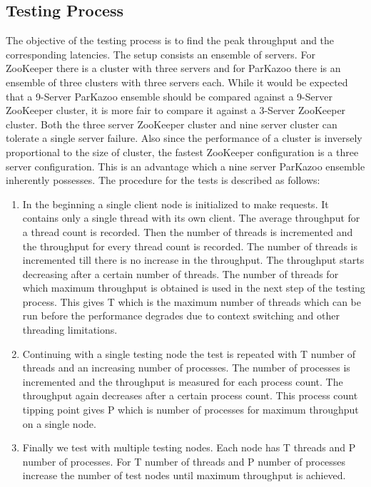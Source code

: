 \subsection{Testing Process}
The objective of the testing process is to find the peak throughput and the corresponding latencies. The setup consists an ensemble of servers. For ZooKeeper there is a cluster with three servers and for ParKazoo there is an ensemble of three clusters with three servers each. While it would be expected that a 9-Server ParKazoo ensemble should be compared against a 9-Server ZooKeeper cluster, it is more fair to compare it against a 3-Server ZooKeeper cluster. Both the three server ZooKeeper cluster and nine server cluster can tolerate a single server failure. Also since the performance of a cluster is inversely proportional to the size of cluster, the fastest ZooKeeper configuration is a three server configuration. This is an advantage which a nine server ParKazoo ensemble inherently possesses. The procedure for the tests is described as follows:

\begin{enumerate}
	\item In the beginning a single client node is initialized to make requests. It contains only a single thread with its own client. The average throughput for a thread count is recorded. Then the number of threads is incremented and the throughput for every thread count is recorded. The number of threads is incremented till there is no increase in the throughput. The throughput starts decreasing after a certain number of threads. The number of threads for which maximum throughput is obtained is used in the next step of the testing process. This gives T which is the maximum number of threads which can be run before the performance degrades due to context switching and other threading limitations.
	\item Continuing with a single testing node the test is repeated with T number of threads and an increasing number of processes. The number of processes is incremented and the throughput is measured for each process count. The throughput again decreases after a certain process count. This process count tipping point gives P which is number of processes for maximum throughput on a single node.
	\item Finally we test with multiple testing nodes. Each node has T threads and P number of processes. For T number of threads and P number of processes increase the number of test nodes until maximum throughput is achieved.
\end{enumerate}

